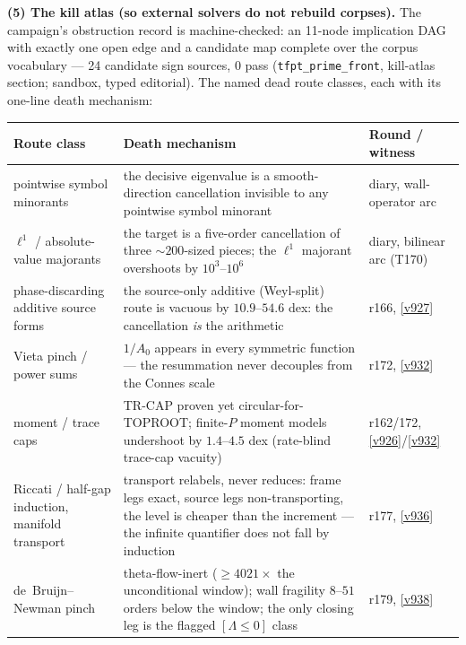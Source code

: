 \par\smallskip\noindent\textbf{(5) The kill atlas (so external solvers do not rebuild
corpses).}  The campaign's obstruction record is machine-checked: an 11-node implication DAG
with exactly one open edge and a candidate map complete over the corpus vocabulary --- 24
candidate sign sources, $0$ pass (\texttt{tfpt\_prime\_front}, kill-atlas section; sandbox,
typed editorial).  The named dead route classes, each with its one-line death mechanism:
\begin{center}\footnotesize
\renewcommand{\arraystretch}{1.22}
\begin{tabularx}{\linewidth}{@{}>{\hsize=0.62\hsize\raggedright\arraybackslash}X>{\hsize=1.08\hsize\raggedright\arraybackslash}X>{\hsize=0.30\hsize\raggedright\arraybackslash}X@{}}
\toprule
\textbf{Route class} & \textbf{Death mechanism} & \textbf{Round / witness} \\
\midrule
pointwise symbol minorants & the decisive eigenvalue is a smooth-direction cancellation invisible to any pointwise symbol minorant & diary, wall-operator arc \\
$\ell^1$ / absolute-value majorants & the target is a five-order cancellation of three ${\sim}200$-sized pieces; the $\ell^1$ majorant overshoots by $10^{3}$--$10^{6}$ & diary, bilinear arc (T170) \\
phase-discarding additive source forms & the source-only additive (Weyl-split) route is vacuous by $10.9$--$54.6$ dex: the cancellation \emph{is} the arithmetic & r166, \vref{v927} \\
Vieta pinch / power sums & $1/A_0$ appears in every symmetric function --- the resummation never decouples from the Connes scale & r172, \vref{v932} \\
moment / trace caps & TR-CAP proven yet circular-for-TOPROOT; finite-$P$ moment models undershoot by $1.4$--$4.5$ dex (rate-blind trace-cap vacuity) & r162/172, \vref{v926}/\vref{v932} \\
Riccati / half-gap induction, manifold transport & transport relabels, never reduces: frame legs exact, source legs non-transporting, the level is cheaper than the increment --- the infinite quantifier does not fall by induction & r177, \vref{v936} \\
de~Bruijn--Newman pinch & theta-flow-inert ($\ge 4021\times$ the unconditional window); wall fragility $8$--$51$ orders below the window; the only closing leg is the flagged $[\Lambda \le 0]$ class & r179, \vref{v938} \\

\end{tabularx}
\end{center}

